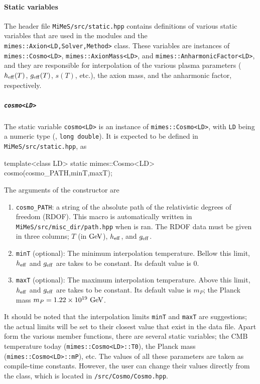 \documentclass[11pt,a4paper]{article}
\begin{document}
\paragraph{Static variables} The header file {\tt MiMeS/src/static.hpp} contains definitions of various static variables that are used in the \PY modules and the {\tt mimes::Axion<LD,Solver,Method>} class. These variables are instances of  {\tt mimes::Cosmo<LD>}, {\tt mimes::AxionMass<LD>}, and {\tt mimes::AnharmonicFactor<LD>}, and they are responsible for interpolation of the various plasma parameters (\ie $h_{\rm eff}{}(T)$, $g_{\rm eff}{}(T)$, $s(T)$, etc.), the axion mass, and the anharmonic factor, respectively.

\subparagraph{{\tt cosmo<LD>}} The static variable {\tt cosmo<LD>} is an instance of {\tt mimes::Cosmo<LD>}, with {\tt LD} being a numeric type (, {\tt long double}). It is expected to be defined in {\tt MiMeS/src/static.hpp}, as 
%
\begin{cpp}
	template<class LD> static mimes::Cosmo<LD> cosmo(cosmo_PATH,minT,maxT);
\end{cpp}
%
The arguments of the constructor are
%
\begin{enumerate}
	\item {\tt cosmo\_PATH}: a string of the absolute path of the relativistic degrees of freedom (RDOF). This macro is automatically
	written in {\tt MiMeS/src/misc\_dir/path.hpp} when  is ran. The RDOF data must be given in three columns; $T$ (in ${\rm GeV}$), $h_{\rm eff}{}$, and $g_{\rm eff}{}$.
	\item {\tt minT} (optional): The minimum interpolation temperature. Bellow this limit, $h_{\rm eff}{}$ and $g_{\rm eff}{}$ are takes to be constant. Its default value is $0$.
	\item {\tt maxT} (optional): The maximum interpolation temperature. Above this limit, $h_{\rm eff}{}$ and $g_{\rm eff}{}$ are takes to be constant. Its default value is $m_P$; the Planck mass $m_P = 1.22 \times 10^{19}~{\rm GeV}$.
\end{enumerate} 
%
It should be noted that  the interpolation limits {\tt minT} and {\tt maxT} are suggestions; the actual limits will be set to their closest value that exist in the data file. Apart form the various member functions, there are several static variables; \eg the CMB temperature today ({\tt mimes::Cosmo<LD>::T0}), the Planck mass ({\tt mimes::Cosmo<LD>::mP}), etc. The values of all these parameters are taken as compile-time constants. However, the user can change their values directly from the class, which is located in {\tt \mimes/src/Cosmo/Cosmo.hpp}.
\end{document}
